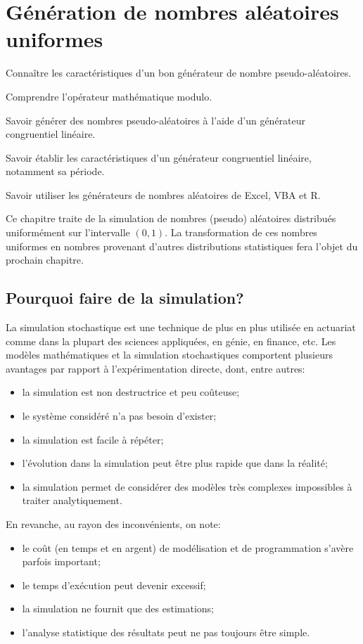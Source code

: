 \chapter{Génération de nombres aléatoires uniformes}
\label{chap:generation}

\begin{objectifs}
\item Connaître les caractéristiques d'un bon générateur de nombre
  pseudo-aléatoires.
\item Comprendre l'opérateur mathématique modulo.
\item Savoir générer des nombres pseudo-aléatoires à l'aide d'un
  générateur congruentiel linéaire.
\item Savoir établir les caractéristiques d'un générateur congruentiel
  linéaire, notamment sa période.
\item Savoir utiliser les générateurs de nombres aléatoires de Excel,
  VBA et R.
\end{objectifs}

Ce chapitre traite de la simulation de nombres (pseudo) aléatoires
distribués uniformément sur l'intervalle $(0, 1)$. La transformation
de ces nombres uniformes en nombres provenant d'autres distributions
statistiques fera l'objet du prochain chapitre.


\section{Pourquoi faire de la simulation?}
\label{sec:generation:pourquoi}

La simulation stochastique est une technique de plus en plus utilisée
en actuariat comme dans la plupart des sciences appliquées, en génie,
en finance, etc. Les modèles mathématiques et la simulation
stochastiques comportent plusieurs avantages par rapport à
l'expérimentation directe, dont, entre autres:
\begin{itemize}
\item la simulation est non destructrice et peu coûteuse;
\item le système considéré n'a pas besoin d'exister;
\item la simulation est facile à répéter;
\item l'évolution dans la simulation peut être plus rapide que dans la
  réalité;
\item la simulation permet de considérer des modèles très complexes
  impossibles à traiter analytiquement.
\end{itemize}
En revanche, au rayon des inconvénients, on note:
\begin{itemize}
\item le coût (en temps et en argent) de modélisation et de
  programmation s'avère parfois important;
\item le temps d'exécution peut devenir excessif;
\item la simulation ne fournit que des estimations;
\item l'analyse statistique des résultats peut ne pas toujours être
  simple.
\end{itemize}

